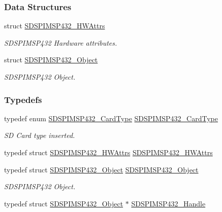 \subsubsection*{Data Structures}
\begin{DoxyCompactItemize}
\item 
struct \hyperlink{struct_s_d_s_p_i_m_s_p432___h_w_attrs}{S\+D\+S\+P\+I\+M\+S\+P432\+\_\+\+H\+W\+Attrs}
\begin{DoxyCompactList}\small\item\em S\+D\+S\+P\+I\+M\+S\+P432 Hardware attributes. \end{DoxyCompactList}\item 
struct \hyperlink{struct_s_d_s_p_i_m_s_p432___object}{S\+D\+S\+P\+I\+M\+S\+P432\+\_\+\+Object}
\begin{DoxyCompactList}\small\item\em S\+D\+S\+P\+I\+M\+S\+P432 Object. \end{DoxyCompactList}\end{DoxyCompactItemize}
\subsubsection*{Typedefs}
\begin{DoxyCompactItemize}
\item 
typedef enum \hyperlink{_s_d_s_p_i_m_s_p432_8h_ac9da30e77207a761e49f62dac9ee8996}{S\+D\+S\+P\+I\+M\+S\+P432\+\_\+\+Card\+Type} \hyperlink{_s_d_s_p_i_m_s_p432_8h_aad861043f3776932f1db6be9288d1ac3}{S\+D\+S\+P\+I\+M\+S\+P432\+\_\+\+Card\+Type}
\begin{DoxyCompactList}\small\item\em S\+D Card type inserted. \end{DoxyCompactList}\item 
typedef struct \hyperlink{struct_s_d_s_p_i_m_s_p432___h_w_attrs}{S\+D\+S\+P\+I\+M\+S\+P432\+\_\+\+H\+W\+Attrs} \hyperlink{_s_d_s_p_i_m_s_p432_8h_ad888e025ad06e9aa9d33f288412305cd}{S\+D\+S\+P\+I\+M\+S\+P432\+\_\+\+H\+W\+Attrs}
\item 
typedef struct \hyperlink{struct_s_d_s_p_i_m_s_p432___object}{S\+D\+S\+P\+I\+M\+S\+P432\+\_\+\+Object} \hyperlink{_s_d_s_p_i_m_s_p432_8h_a2f43671b60066041c2e72a427332f3a5}{S\+D\+S\+P\+I\+M\+S\+P432\+\_\+\+Object}
\begin{DoxyCompactList}\small\item\em S\+D\+S\+P\+I\+M\+S\+P432 Object. \end{DoxyCompactList}\item 
typedef struct \hyperlink{struct_s_d_s_p_i_m_s_p432___object}{S\+D\+S\+P\+I\+M\+S\+P432\+\_\+\+Object} $\ast$ \hyperlink{_s_d_s_p_i_m_s_p432_8h_a1813d2b4359c9ae73e218d7b981891a6}{S\+D\+S\+P\+I\+M\+S\+P432\+\_\+\+Handle}
\end{DoxyCompactItemize}
